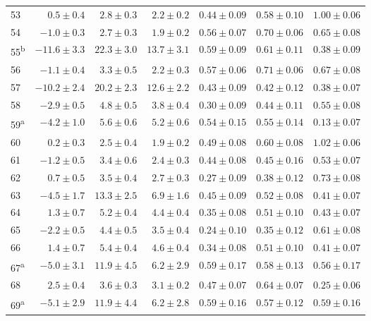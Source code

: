 \begin{tabular}{l r r r r r r}
53 & $0.5 \pm 0.4$ & $2.8 \pm 0.3$ & $2.2 \pm 0.2$ & $0.44 \pm 0.09$ & $0.58 \pm 0.10$ & $1.00 \pm 0.06$ \\ 
54 & $-1.0 \pm 0.3$ & $2.7 \pm 0.3$ & $1.9 \pm 0.2$ & $0.56 \pm 0.07$ & $0.70 \pm 0.06$ & $0.65 \pm 0.08$ \\ 
55\textsuperscript{b} & $-11.6 \pm 3.3$ & $22.3 \pm 3.0$ & $13.7 \pm 3.1$ & $0.59 \pm 0.09$ & $0.61 \pm 0.11$ & $0.38 \pm 0.09$ \\ 
56 & $-1.1 \pm 0.4$ & $3.3 \pm 0.5$ & $2.2 \pm 0.3$ & $0.57 \pm 0.06$ & $0.71 \pm 0.06$ & $0.67 \pm 0.08$ \\ 
57 & $-10.2 \pm 2.4$ & $20.2 \pm 2.3$ & $12.6 \pm 2.2$ & $0.43 \pm 0.09$ & $0.42 \pm 0.12$ & $0.38 \pm 0.07$ \\ 
58 & $-2.9 \pm 0.5$ & $4.8 \pm 0.5$ & $3.8 \pm 0.4$ & $0.30 \pm 0.09$ & $0.44 \pm 0.11$ & $0.55 \pm 0.08$ \\ 
59\textsuperscript{a} & $-4.2 \pm 1.0$ & $5.6 \pm 0.6$ & $5.2 \pm 0.6$ & $0.54 \pm 0.15$ & $0.55 \pm 0.14$ & $0.13 \pm 0.07$ \\ 
60 & $0.2 \pm 0.3$ & $2.5 \pm 0.4$ & $1.9 \pm 0.2$ & $0.49 \pm 0.08$ & $0.60 \pm 0.08$ & $1.02 \pm 0.06$ \\ 
61 & $-1.2 \pm 0.5$ & $3.4 \pm 0.6$ & $2.4 \pm 0.3$ & $0.44 \pm 0.08$ & $0.45 \pm 0.16$ & $0.53 \pm 0.07$ \\ 
62 & $0.7 \pm 0.5$ & $3.5 \pm 0.4$ & $2.7 \pm 0.3$ & $0.27 \pm 0.09$ & $0.38 \pm 0.12$ & $0.73 \pm 0.08$ \\ 
63 & $-4.5 \pm 1.7$ & $13.3 \pm 2.5$ & $6.9 \pm 1.6$ & $0.45 \pm 0.09$ & $0.52 \pm 0.08$ & $0.41 \pm 0.07$ \\ 
64 & $1.3 \pm 0.7$ & $5.2 \pm 0.4$ & $4.4 \pm 0.4$ & $0.35 \pm 0.08$ & $0.51 \pm 0.10$ & $0.43 \pm 0.07$ \\ 
65 & $-2.2 \pm 0.5$ & $4.4 \pm 0.5$ & $3.5 \pm 0.4$ & $0.24 \pm 0.10$ & $0.35 \pm 0.12$ & $0.61 \pm 0.08$ \\ 
66 & $1.4 \pm 0.7$ & $5.4 \pm 0.4$ & $4.6 \pm 0.4$ & $0.34 \pm 0.08$ & $0.51 \pm 0.10$ & $0.41 \pm 0.07$ \\ 
67\textsuperscript{a} & $-5.0 \pm 3.1$ & $11.9 \pm 4.5$ & $6.2 \pm 2.9$ & $0.59 \pm 0.17$ & $0.58 \pm 0.13$ & $0.56 \pm 0.17$ \\ 
68 & $2.5 \pm 0.4$ & $3.6 \pm 0.3$ & $3.1 \pm 0.2$ & $0.47 \pm 0.07$ & $0.64 \pm 0.07$ & $0.25 \pm 0.06$ \\ 
69\textsuperscript{a} & $-5.1 \pm 2.9$ & $11.9 \pm 4.4$ & $6.2 \pm 2.8$ & $0.59 \pm 0.16$ & $0.57 \pm 0.12$ & $0.59 \pm 0.16$ \\ 

\end{tabular}
